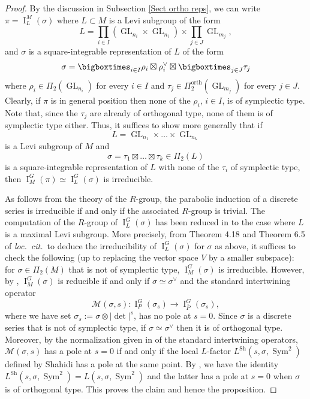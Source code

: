 \documentclass[12pt]{article}
\numberwithin{equation}{section}
\DeclareMathOperator{\orth}{orth}
\DeclareMathOperator{\Sym}{Sym}
\DeclareMathOperator{\GL}{\mathrm{GL}}
\DeclareMathOperator{\Sh}{Sh}
\DeclareMathOperator{\rI}{\mathrm{I}}
\begin{document}
	\begin{proof}
	By the discussion in Subsection \ref{Sect ortho reps}, we can write $\pi=\rI_L^M(\sigma)$ where $L\subset M$ is a Levi subgroup of the form
	$$\displaystyle L= \prod_{i\in I} (\GL_{n_i}\times \GL_{n_i})\times \prod_{j\in J} \GL_{m_j},$$
	and $\sigma$ is a square-integrable representation of $L$ of the form
	$$\displaystyle \sigma=\bigboxtimes_{i\in I} \rho_i\boxtimes \rho_i^\vee \boxtimes \bigboxtimes_{j\in J} \tau_j$$
	where $\rho_i\in \Pi_2(\GL_{n_i})$ for every $i\in I$ and $\tau_j\in \Pi_2^{\orth}(\GL_{m_j})$ for every $j\in J$. Clearly, if $\pi$ is in general position then none of the $\rho_i$, $i\in I$, is of symplectic type. Note that, since the $\tau_j$ are already of orthogonal type, none of them is of symplectic type either. Thus, it suffices to show more generally that if
	$$\displaystyle L=\GL_{n_1}\times \ldots \times \GL_{n_k}$$
	is a Levi subgroup of $M$ and
	$$\displaystyle \sigma=\tau_1\boxtimes \ldots \boxtimes \tau_k\in \Pi_2(L)$$
	is a square-integrable representation of $L$ with none of the $\tau_i$ of symplectic type, then $\rI_M^G(\pi)\simeq \rI_L^G(\sigma)$ is irreducible.
	
	As follows from the theory of the $R$-group, the parabolic induction of a discrete series is irreducible if and only if the associated $R$-group is trivial. The computation of the $R$-group of $\rI_L^G(\sigma)$ has been reduced in \cite{GoldSO} to the case where $L$ is a maximal Levi subgroup. More precisely, from Theorem 4.18 and Theorem 6.5 of {\it loc.\ cit.}\, to deduce the irreducibility of $\rI_L^G(\sigma)$ for $\sigma$ as above, it suffices to check the following (up to replacing the vector space $V$ by a smaller subspace): for $\sigma\in \Pi_2(M)$ that is not of symplectic type, $\rI_M^G(\sigma)$ is irreducible. However, by \cite[Corollary 5.4.2.3]{Silb}, $\rI_M^G(\sigma)$ is reducible if and only if $\sigma\simeq \sigma^\vee$ and the standard intertwining operator
	$$\displaystyle \mathcal{M}(\sigma,s): \rI_P^G(\sigma_s)\to \rI_{\overline{P}}^G(\sigma_s),$$
	where we have set $\sigma_s:=\sigma\otimes \lvert \det\rvert^s$, has no pole at $s=0$. Since $\sigma$ is a discrete series that is not of symplectic type, if $\sigma\simeq \sigma^\vee$ then it is of orthogonal type. Moreover, by the normalization given in \cite{ShaLangconj} of the standard intertwining operators, $\mathcal{M}(\sigma,s)$ has a pole at $s=0$ if and only if the local $L$-factor $L^{\Sh}(s,\sigma,\Sym^2)$ defined by Shahidi has a pole at the same point. By \cite{HenLfn}, we have the identity $L^{\Sh}(s,\sigma,\Sym^2)=L(s,\sigma,\Sym^2)$ and the latter has a pole at $s=0$ when $\sigma$ is of orthogonal type. This proves the claim and hence the proposition.
	\end{proof}
\end{document}
